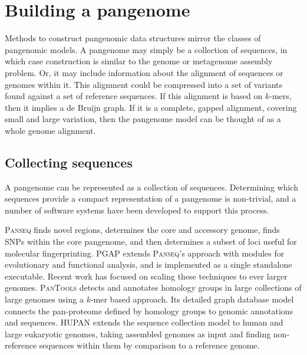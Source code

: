


\section{Building a pangenome}

Methods to construct pangenomic data structures mirror the classes of pangenomic models.
A pangenome may simply be a collection of sequences, in which case construction is similar to the genome or metagenome assembly problem.
Or, it may include information about the alignment of sequences or genomes within it.
This alignment could be compressed into a set of variants found against a set of reference sequences.
If this alignment is based on $k$-mers, then it implies a de Bruijn graph.
If it is a complete, gapped alignment, covering small and large variation, then the pangenome model can be thought of as a whole genome alignment.

\subsection{Collecting sequences}

A pangenome can be represented as a collection of sequences.
Determining which sequences provide a compact representation of a pangenome is non-trivial, and a number of software systems have been developed to support this process.

\textsc{Panseq} \cite{Laing_2010} finds novel regions, determines the core and accessory genome, finds SNPs within the core pangenome, and then determines a subset of loci useful for molecular fingerprinting.
\textsc{PGAP} \cite{Zhao_2011} extends \textsc{Panseq}'s approach with modules for evolutionary and functional analysis, and is implemented as a single standalone executable.
Recent work has focused on scaling these techniques to ever larger genomes.
\textsc{PanTools} \cite{Sheikhizadeh_Anari_2018} detects and annotates homology groups in large collections of large genomes using a $k$-mer based approach.
Its detailed graph database model connects the pan-proteome defined by homology groups to genomic annotations and sequences.
\textsc{HUPAN} \citep{Duan_2019} extends the sequence collection model to human and large eukaryotic genomes, taking assembled genomes as input and finding non-reference sequences within them by comparison to a reference genome.


